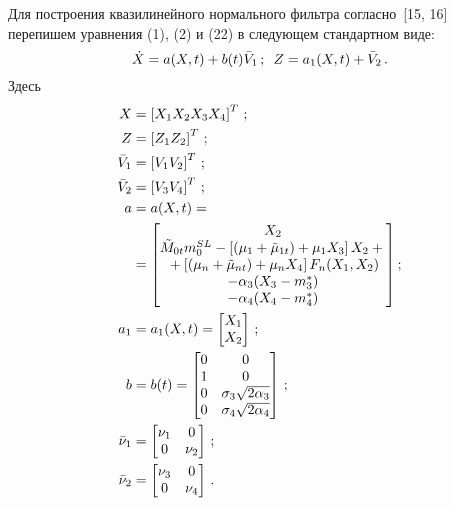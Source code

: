 \begin{multicols}{2}
Для построения квазилинейного нормального фильтра согласно~[15, 16]
перепишем уравнения (1), (2) и (22) в следующем стандартном виде:
 \begin{equation}
 \dot X = a (X,t) + b(t) \bar V_1\,;\enskip Z= a_1 (X, t) +\bar V_2\,.\label{e40}
 \end{equation}
Здесь
\begin{align*}
 X&=\left[ X_1 X_2 X_3 X_4\right]^T\,;\\%
 Z&= \left[ Z_1 Z_2\right]^T\,;\notag\\
 \bar V_1 &= \left[ V_1 V_2\right]^T\,;\\%
 \bar V_2& =\left[ V_3 V_4\right]^T\,;\notag\\
 a&=a(X,t) ={} \\
{}&=\begin{bmatrix}
 X_2\\
 \tilde M_{0t} m_{0}^{SL} - \left[ \left(\mu_1 +\tilde\mu_{1t}\right) +\mu_1 X_3 \right] X_2 +{}\\
 {}+\left[\left(\mu_n+\tilde\mu_{nt}\right) +\mu_n X_4\right] F_n(X_1, X_2)\\
 -\alp_3 (X_3 - m_3^*)\\
 -\alp_4(X_4-m_4^*)
 \end{bmatrix}\!\,;\\
 a_1&=a_1(X,t) =
 \begin{bmatrix}
 X_1\\
 X_2\\ \end{bmatrix}\,;\notag\\
 b&=b(t) =
 \begin{bmatrix}
 0&0\\
 1&0\\
 0&\si_3\sqrt{2\alp_3}\\
 0&\si_4 \sqrt{2\alp_4}\\
 \end{bmatrix}\,;\notag\\
 \bar\nu_1 &=\begin{bmatrix}
 \nu_1&0\\
 0&\nu_2\\
 \end{bmatrix}\,;\\%
\bar\nu_2&=\begin{bmatrix}
 \nu_3&0\\
 0&\nu_4\\
 \end{bmatrix}\,. %
\end{align*}


\end{multicols}
